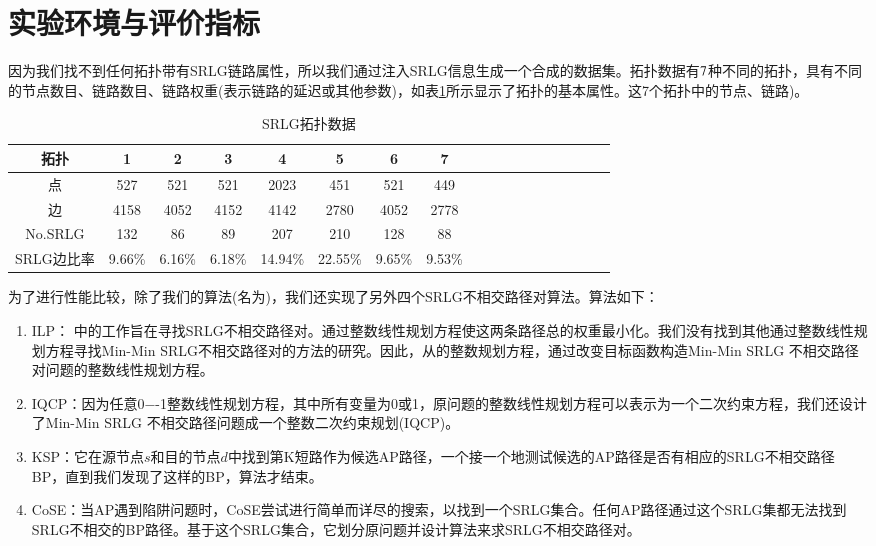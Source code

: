 
\section{实验环境与评价指标}

因为我们找不到任何拓扑带有SRLG链路属性，所以我们通过注入SRLG信息生成一个合成的数据集。拓扑数据有$7$种不同的拓扑，具有不同的节点数目、链路数目、链路权重(表示链路的延迟或其他参数)，如表\ref{tab:AllSample}所示显示了拓扑的基本属性。这7个拓扑中的节点、链路)。

\begin{table}[htbp]
\caption{SRLG拓扑数据}
  \centering
\footnotesize{  \begin{tabular}{*{18}{c}}
\toprule
拓扑 & 1 & 2 & 3 & 4 & 5 & 6& 7   \\
\midrule
点   &     527&      521    &      521     &    2023             &     451     &     521     &     449       \\
边   &    4158 &  4052     &    4152      &   4142          &       2780   &      4052   &      2778    \\
No.SRLG & 132 &  86   &  89  &  207        & 210  &  128  &   88    \\
SRLG边比率 & 9.66\% & 6.16\% &   6.18\% &   14.94\%    &   22.55\%  &  9.65\% &   9.53\%     \\
\bottomrule
\end{tabular}
}
\label{tab:AllSample}
\end{table}

为了进行性能比较，除了我们的算法(名为\CI)，我们还实现了另外四个SRLG不相交路径对算法。算法如下：
\begin{enumerate}
  \item ILP：\cite{hu2003diverse} 中的工作旨在寻找SRLG不相交路径对。通过整数线性规划方程使这两条路径总的权重最小化。我们没有找到其他通过整数线性规划方程寻找Min-Min SRLG不相交路径对的方法的研究。因此，从\cite{hu2003diverse}的整数规划方程，通过改变目标函数构造Min-Min SRLG 不相交路径对问题的整数线性规划方程。
  \item IQCP：因为任意0−-1整数线性规划方程，其中所有变量为0或1，原问题的整数线性规划方程可以表示为一个二次约束方程，我们还设计了Min-Min SRLG 不相交路径问题成一个整数二次约束规划(IQCP)\cite{hu2003diverse}。
  \item KSP\cite{eppstein1998finding}：它在源节点$s$和目的节点$d$中找到第K短路作为候选AP路径，一个接一个地测试候选的AP路径是否有相应的SRLG不相交路径BP，直到我们发现了这样的BP，算法才结束。
  \item CoSE\cite{rostami2007cose}：当AP遇到陷阱问题时，CoSE尝试进行简单而详尽的搜索，以找到一个SRLG集合。任何AP路径通过这个SRLG集都无法找到SRLG不相交的BP路径。基于这个SRLG集合，它划分原问题并设计算法来求SRLG不相交路径对。
\end{enumerate}



